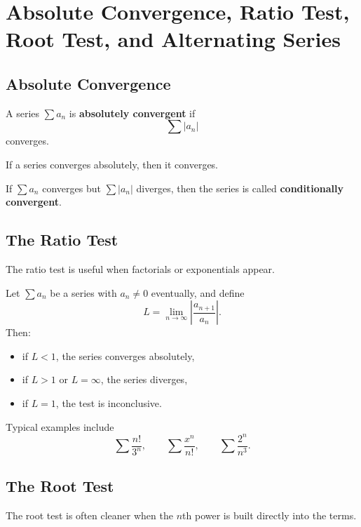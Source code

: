 \chapter*{Absolute Convergence, Ratio Test, Root Test, and Alternating Series}

\section*{Absolute Convergence}

\begin{definition}
A series $\sum a_n$ is \textbf{absolutely convergent} if
$$\sum |a_n|$$
converges.
\end{definition}

\begin{theorem}
If a series converges absolutely, then it converges.
\end{theorem}

If $\sum a_n$ converges but $\sum |a_n|$ diverges, then the series is called \textbf{conditionally convergent}.

\section*{The Ratio Test}

The ratio test is useful when factorials or exponentials appear.

\begin{theorem}
Let $\sum a_n$ be a series with $a_n\neq 0$ eventually, and define
$$L = \lim_{n\to\infty}\left|\frac{a_{n+1}}{a_n}\right|.$$ 
Then:
\begin{itemize}
    \item if $L<1$, the series converges absolutely,
    \item if $L>1$ or $L=\infty$, the series diverges,
    \item if $L=1$, the test is inconclusive.
\end{itemize}
\end{theorem}

Typical examples include
$$\sum \frac{n!}{3^n}, \qquad \sum \frac{x^n}{n!}, \qquad \sum \frac{2^n}{n^3}.$$ 

\section*{The Root Test}

The root test is often cleaner when the $n$th power is built directly into the terms.

